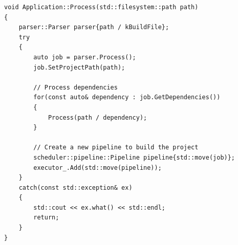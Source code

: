 \begin{lstlisting}[label=list:application,caption=Implementacja metody Application::Process(),basicstyle=\footnotesize\ttfamily]
void Application::Process(std::filesystem::path path)
{
	parser::Parser parser{path / kBuildFile};
	try
	{
		auto job = parser.Process();
		job.SetProjectPath(path);

		// Process dependencies
		for(const auto& dependency : job.GetDependencies())
		{
			Process(path / dependency);
		}

		// Create a new pipeline to build the project
		scheduler::pipeline::Pipeline pipeline{std::move(job)};
		executor_.Add(std::move(pipeline));
	}
	catch(const std::exception& ex)
	{
		std::cout << ex.what() << std::endl;
		return;
	}
}
\end{lstlisting}
